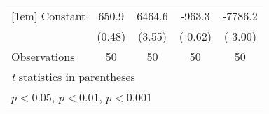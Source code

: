 {\begin{tabular}{l*{4}{c}}
[1em]
Constant            &       650.9         &      6464.6\sym{***}&      -963.3         &     -7786.2\sym{**} \\
                    &      (0.48)         &      (3.55)         &     (-0.62)         &     (-3.00)         \\
\hline
Observations        &          50         &          50         &          50         &          50         \\
\hline\hline
\multicolumn{5}{l}{\footnotesize \textit{t} statistics in parentheses}\\
\multicolumn{5}{l}{\footnotesize \sym{*} \(p<0.05\), \sym{**} \(p<0.01\), \sym{***} \(p<0.001\)}\\
\end{tabular}
}
